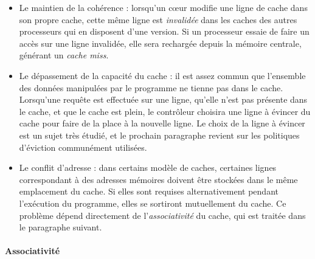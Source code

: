 \begin{itemize}
  \item Le maintien de la cohérence : lorsqu'un cœur modifie une ligne de cache dans son propre cache, cette même ligne est \emph{invalidée} dans les caches des autres processeurs qui en disposent d'une version.
Si un processeur essaie de faire un accès sur une ligne invalidée, elle sera rechargée depuis la mémoire centrale, générant un \emph{cache miss}.
  \item Le dépassement de la capacité du cache : il est assez commun que l'ensemble des données manipulées par le programme ne tienne pas dans le cache.
Lorsqu'une requête est effectuée sur une ligne, qu'elle n'est pas présente dans le cache, et que le cache est plein, le contrôleur choisira une ligne à évincer du cache pour faire de la place à la nouvelle ligne.
Le choix de la ligne à évincer est un sujet très étudié, et le prochain paragraphe revient sur les politiques d'éviction communément utilisées.
  \item Le conflit d'adresse : dans certains modèle de caches, certaines lignes correspondant à des adresses mémoires doivent être stockées dans le même emplacement du cache.
    Si elles sont requises alternativement pendant l'exécution du programme, elles se sortiront mutuellement du cache.
    Ce problème dépend directement de l'\emph{associativité} du cache, qui est traitée dans le paragraphe suivant.
\end{itemize}



\paragraph{Associativité}

